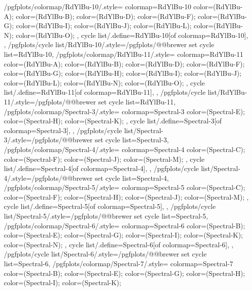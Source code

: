 {  %
  /pgfplots/colormap/RdYlBu-10/.style={
    colormap={RdYlBu-10}{
      color=(RdYlBu-A);
      color=(RdYlBu-B);
      color=(RdYlBu-D);
      color=(RdYlBu-F);
      color=(RdYlBu-G);
      color=(RdYlBu-I);
      color=(RdYlBu-J);
      color=(RdYlBu-L);
      color=(RdYlBu-N);
      color=(RdYlBu-O);
    },
    cycle list/.define={RdYlBu-10}{[of colormap=RdYlBu-10]},
  },
  /pgfplots/cycle list/RdYlBu-10/.style={/pgfplots/@@brewer set cycle list={RdYlBu-10}},
  /pgfplots/colormap/RdYlBu-11/.style={
    colormap={RdYlBu-11}{
      color=(RdYlBu-A);
      color=(RdYlBu-B);
      color=(RdYlBu-D);
      color=(RdYlBu-F);
      color=(RdYlBu-G);
      color=(RdYlBu-H);
      color=(RdYlBu-I);
      color=(RdYlBu-J);
      color=(RdYlBu-L);
      color=(RdYlBu-N);
      color=(RdYlBu-O);
    },
    cycle list/.define={RdYlBu-11}{[of colormap=RdYlBu-11]},
  },
  /pgfplots/cycle list/RdYlBu-11/.style={/pgfplots/@@brewer set cycle list={RdYlBu-11}},
  /pgfplots/colormap/Spectral-3/.style={
    colormap={Spectral-3}{
      color=(Spectral-E);
      color=(Spectral-H);
      color=(Spectral-K);
    },
    cycle list/.define={Spectral-3}{[of colormap=Spectral-3]},
  },
  /pgfplots/cycle list/Spectral-3/.style={/pgfplots/@@brewer set cycle list={Spectral-3}},
  /pgfplots/colormap/Spectral-4/.style={
    colormap={Spectral-4}{
      color=(Spectral-C);
      color=(Spectral-F);
      color=(Spectral-J);
      color=(Spectral-M);
    },
    cycle list/.define={Spectral-4}{[of colormap=Spectral-4]},
  },
  /pgfplots/cycle list/Spectral-4/.style={/pgfplots/@@brewer set cycle list={Spectral-4}},
  /pgfplots/colormap/Spectral-5/.style={
    colormap={Spectral-5}{
      color=(Spectral-C);
      color=(Spectral-F);
      color=(Spectral-H);
      color=(Spectral-J);
      color=(Spectral-M);
    },
    cycle list/.define={Spectral-5}{[of colormap=Spectral-5]},
  },
  /pgfplots/cycle list/Spectral-5/.style={/pgfplots/@@brewer set cycle list={Spectral-5}},
  /pgfplots/colormap/Spectral-6/.style={
    colormap={Spectral-6}{
      color=(Spectral-B);
      color=(Spectral-E);
      color=(Spectral-G);
      color=(Spectral-I);
      color=(Spectral-K);
      color=(Spectral-N);
    },
    cycle list/.define={Spectral-6}{[of colormap=Spectral-6]},
  },
  /pgfplots/cycle list/Spectral-6/.style={/pgfplots/@@brewer set cycle list={Spectral-6}},
  /pgfplots/colormap/Spectral-7/.style={
    colormap={Spectral-7}{
      color=(Spectral-B);
      color=(Spectral-E);
      color=(Spectral-G);
      color=(Spectral-H);
      color=(Spectral-I);
      color=(Spectral-K);
}}}
